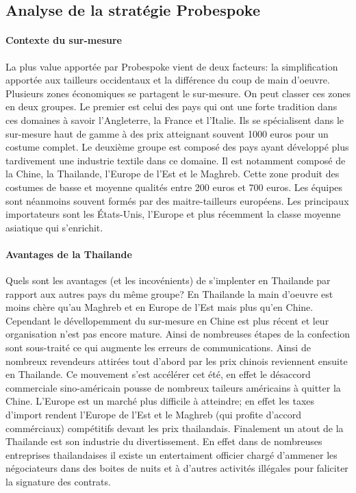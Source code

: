 \subsection{Analyse de la stratégie Probespoke}
\paragraph{Contexte du sur-mesure}
La plus value apportée par Probespoke vient de deux facteurs: la simplification apportée aux tailleurs occidentaux et la différence du coup de main d'oeuvre. Plusieurs zones économiques se partagent le sur-mesure. On peut classer ces zones en deux groupes. Le premier est celui des pays qui ont une forte tradition dans ces domaines à savoir l'Angleterre, la France et l'Italie. Ils se spécialisent dans le sur-mesure haut de gamme à des prix atteignant souvent 1000 euros pour un costume complet. Le deuxième groupe est composé des pays ayant développé plus tardivement une industrie textile dans ce domaine. Il est notamment composé de la Chine, la Thailande, l'Europe de l'Est et le Maghreb. Cette zone produit des costumes de basse et moyenne qualités entre 200 euros et 700 euros. Les équipes sont néanmoins souvent formés par des maitre-tailleurs européens.  Les principaux importateurs sont les États-Unis, l'Europe et plus récemment la classe moyenne asiatique qui s'enrichit.
\paragraph{Avantages de la Thailande} Quels sont les avantages (et les incovénients) de s'implenter en Thailande par rapport aux autres pays du même groupe? En Thailande la main d'oeuvre est moins chère qu'au Maghreb et en Europe de l'Est mais plus qu'en Chine. Cependant le dévellopemment du sur-mesure en Chine est plus récent et leur organisation n'est pas encore mature. Ainsi de nombreuses étapes de la confection sont sous-traité ce qui augmente les erreurs de communications. Ainsi de nombreux revendeurs attirées tout d'abord par les prix chinois reviennent ensuite en Thailande. Ce mouvement s'est accélérer cet été, en effet le désaccord commerciale sino-américain pousse de nombreux taileurs américains à quitter la Chine. L'Europe est un marché plus difficile à atteindre; en effet les taxes d'import rendent l'Europe de l'Est et le Maghreb (qui profite d'accord commérciaux) compétitifs devant les prix thailandais. Finalement un atout de la Thailande est son industrie du divertissement. En effet dans de nombreuses entreprises thailandaises il existe un entertaiment officier chargé d'ammener les négociateurs dans des boites de nuits et à d'autres activités illégales pour faliciter la signature des contrats.
